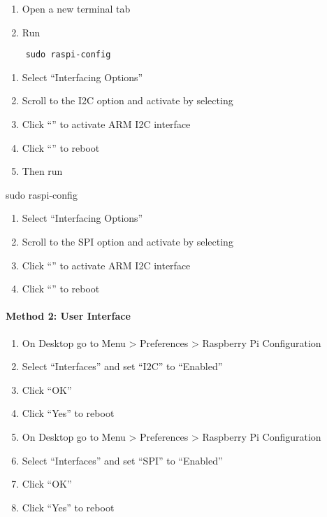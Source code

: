 \documentclass[
]{article}
\newenvironment{Shaded}{}{}
\newcommand{\FunctionTok}[1]{\textcolor[rgb]{0.02,0.16,0.49}{#1}}
\newcommand{\NormalTok}[1]{#1}
\providecommand{\tightlist}{%
  \setlength{\itemsep}{0pt}\setlength{\parskip}{0pt}}
\begin{document}
\begin{enumerate}
\def\labelenumi{\arabic{enumi}.}
\tightlist
\item
  Open a new terminal tab
\item
  Run
\end{enumerate}

\begin{verbatim}
    sudo raspi-config
\end{verbatim}

\begin{enumerate}
\def\labelenumi{\arabic{enumi}.}
\setcounter{enumi}{2}
\tightlist
\item
  Select ``Interfacing Options''
\item
  Scroll to the I2C option and activate by selecting
\item
  Click ``'' to activate ARM I2C interface
\item
  Click ``'' to reboot
\item
  Then run
\end{enumerate}

\begin{Shaded}
\begin{Highlighting}[]
\FunctionTok{sudo}\NormalTok{ raspi{-}config}
\end{Highlighting}
\end{Shaded}

\begin{enumerate}
\def\labelenumi{\arabic{enumi}.}
\setcounter{enumi}{7}
\tightlist
\item
  Select ``Interfacing Options''
\item
  Scroll to the SPI option and activate by selecting
\item
  Click ``'' to activate ARM I2C interface
\item
  Click ``'' to reboot
\end{enumerate}

\hypertarget{method-2-user-interface}{%
\paragraph{Method 2: User Interface}\label{method-2-user-interface}}

\begin{enumerate}
\def\labelenumi{\arabic{enumi}.}
\tightlist
\item
  On Desktop go to Menu \textgreater{} Preferences \textgreater{}
  Raspberry Pi Configuration
\item
  Select ``Interfaces'' and set ``I2C'' to ``Enabled''
\item
  Click ``OK''
\item
  Click ``Yes'' to reboot
\item
  On Desktop go to Menu \textgreater{} Preferences \textgreater{}
  Raspberry Pi Configuration
\item
  Select ``Interfaces'' and set ``SPI'' to ``Enabled''
\item
  Click ``OK''
\item
  Click ``Yes'' to reboot
\end{enumerate}
\end{document}
